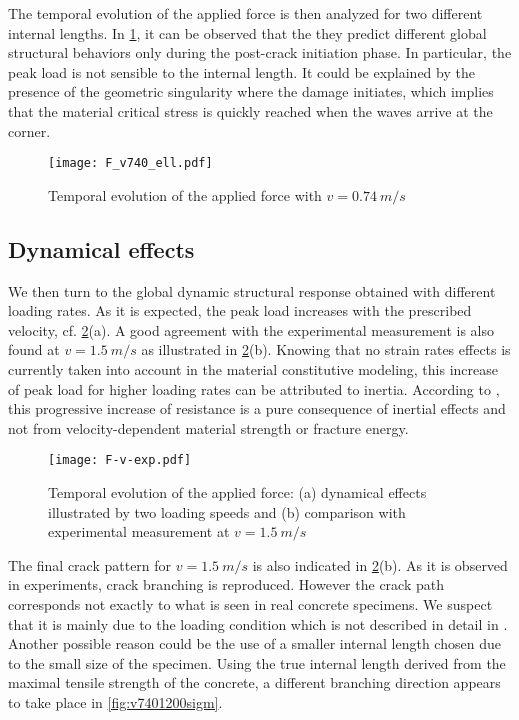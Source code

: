 The temporal evolution of the applied force is then analyzed for two different internal lengths. In \cref{fig:F_v740_ell}, it can be observed that the they predict different global structural behaviors only during the post-crack initiation phase. In particular, the peak load is not sensible to the internal length. It could be explained by the presence of the geometric singularity where the damage initiates, which implies that the material critical stress is quickly reached when the waves arrive at the corner.
\begin{figure}[htbp]
\centering
\texttt{[image: F\_v740\_ell.pdf]}
\caption{Temporal evolution of the applied force with $v=\SI{0.74}{m/s}$} \label{fig:F_v740_ell}
\end{figure}

\subsection{Dynamical effects}
We then turn to the global dynamic structural response obtained with different loading rates. As it is expected, the peak load increases with the prescribed velocity, cf. \cref{fig:F-v-exp}(a). A good agreement with the experimental measurement is also found at $v=\SI{1.5}{m/s}$ as illustrated in \cref{fig:F-v-exp}(b). Knowing that no strain rates effects is currently taken into account in the material constitutive modeling, this increase of peak load for higher loading rates can be attributed to inertia. According to \cite{OzboltBedeSharmaMayer:2015}, this progressive increase of resistance is a pure consequence of inertial effects and not from velocity-dependent material strength or fracture energy.
\begin{figure}[htbp]
\centering
\texttt{[image: F-v-exp.pdf]}
\caption{Temporal evolution of the applied force: (a) dynamical effects illustrated by two loading speeds and (b) comparison with experimental measurement at $v=\SI{1.5}{m/s}$} \label{fig:F-v-exp}
\end{figure}

The final crack pattern for $v=\SI{1.5}{m/s}$ is also indicated in \cref{fig:F-v-exp}(b). As it is observed in experiments, crack branching is reproduced. However the crack path corresponds not exactly to what is seen in real concrete specimens. We suspect that it is mainly due to the loading condition which is not described in detail in \cite{OzboltBedeSharmaMayer:2015}. Another possible reason could be the use of a smaller internal length chosen due to the small size of the specimen. Using the true internal length derived from the maximal tensile strength of the concrete, a different branching direction appears to take place in \cref{fig:v7401200sigm}.

